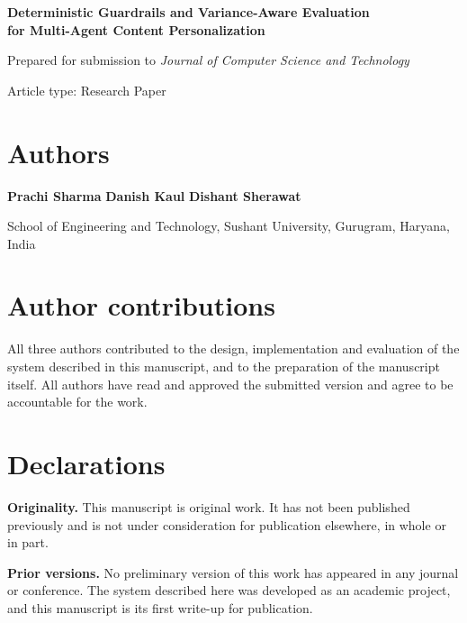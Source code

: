 \documentclass[11pt]{article}
\begin{document}
\begin{center}
{\Large\bfseries Deterministic Guardrails and Variance-Aware Evaluation\\
for Multi-Agent Content Personalization\par}

\vspace{8pt}
{\small Prepared for submission to \emph{Journal of Computer Science and
Technology}\par}
{\small Article type: Research Paper\par}
\end{center}

\vspace{18pt}

\section*{Authors}

\noindent
\textbf{Prachi Sharma}\quad
\textbf{Danish Kaul}\quad
\textbf{Dishant Sherawat}

\vspace{10pt}
\noindent
School of Engineering and Technology, Sushant University,
Gurugram, Haryana, India

\vspace{18pt}

\section*{Author contributions}

All three authors contributed to the design, implementation and evaluation of
the system described in this manuscript, and to the preparation of the
manuscript itself. All authors have read and approved the submitted version and
agree to be accountable for the work.

\vspace{18pt}

\section*{Declarations}

\textbf{Originality.} This manuscript is original work. It has not been
published previously and is not under consideration for publication elsewhere,
in whole or in part.

\vspace{6pt}
\noindent
\textbf{Prior versions.} No preliminary version of this work has appeared in
any journal or conference. The system described here was developed as an
academic project, and this manuscript is its first write-up for publication.
\end{document}
